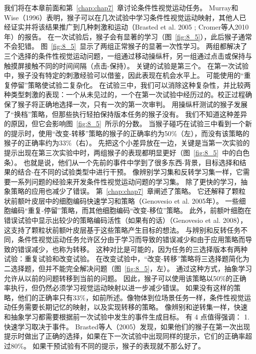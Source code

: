我们将在本章前面和第~\ref{chap:chap7}~章讨论条件性视觉运动任务。
Murray和Wise（1996）表明，猴子可以在几次试验中学习条件性视觉运动映射，其他人已经证实并将该结果推广到几种刺激和运动（Brasted et al. 2005 ; Cromer等人2010年）的报告。
在一次试验后，猴子会有显著的学习（图~\ref{fig:8_5}），此后猴子通常不会犯错。
图~\ref{fig:8_5}~显示了两组正常猴子的显著一次性学习。
两组都解决了三个选择的条件性视觉运动问题，一组通过移动操纵杆，另一组通过点击或保持与触摸屏接触不同的时间间隔（点击-保持）。
关键的试验是第三个。
在第一次试验中，猴子没有特定的刺激经验可以借鉴，因此表现在机会水平上。
可能使用的“重复停留”策略使试验二复杂化。
在试验三中，我们可以消除这种复杂性，并比较两种类型刺激的表现：一个从未见过的，一个在第一次试验中经历过的。校正过程确保了猴子将正确地选择一次，只有一次的第一次审判。
用操纵杆测试的猴子发展了“换档”策略，但那些执行轻拍保持版本任务的猴子没有。
我们不知道这种差异的原因，但它会影响图~\ref{fig:8_5}~所示的分数。
当猴子碰巧在试验三中看到一个新的提示时，使用“改变-转移”策略的猴子的正确率约为50$\%$（左），而没有该策略的猴子的正确率约为33$\%$（右）。
先把这个小差异放在一边，关键是当第一次实验的提示出现在第三次实验中时，两组猴子的表现都明显更好（图~\ref{fig:8_5}~中的白色条）。
也就是说，他们从一个先前的事件中学到了很多东西-背景，目标选择和结果的结合-在不同的试验类型中进行干预。
像辨别学习集和反转学习集一样，它需要一系列问题的经验来开发条件性视觉运动问题的学习集。
除了更快的学习，抽象策略的应用也减少了错误。
第~\ref{chap:chap7}~章阐述了策略。
它还解释了颗粒状前额叶皮层中的细胞编码快速学习和策略（Genovesio et al. 2005年）。
一些细胞编码“重复-停留”策略，而其他细胞编码“改变-移位”策略。
此外，前额叶细胞在错误试验中显示出较少的策略编码活性（如果有的话）（Genovesio et al. 2008），这支持了颗粒状前额叶皮层基于这些策略产生目标的想法。
与辨别和反转任务不同，条件性视觉运动任务允许区分由于学习而导致的错误减少和由于应用策略而导致的错误减少，也称为转移。
这种对比是可能的，因为任务的三选择版本有两种试验：重复试验和改变试验。
在改变试验中，“改变-转移”策略将三选择题简化为二选择题，但并不能完全解决问题（图~\ref{fig:8_5}，左）。
通过这种方式，抽象学习允许从以前的问题转移到当前的问题。
因此，猴子可以使用该策略以50$\%$的正确率执行，但仍然必须学习视觉运动映射以进一步减少错误。
如果没有这样的策略，他们的正确率只有33$\%$，如前所述。像物体到位场景任务一样，条件性视觉运动任务需要长期记忆的映射，以及实现转移的策略。
像辨别和逆转集一样，快速和抽象学习都需要根据前一次试验中发生的事件生成目标。
有 4 点值得强调：
1.快速学习取决于事件。
Brasted等人（2005）发现，如果他们的猴子在第一次出现提示时做出了正确的选择，如果在下一次试验中出现同样的提示，它们的正确率超过80$\%$。
如果干预试验有不同的提示，猴子的表现就不那么好了。
